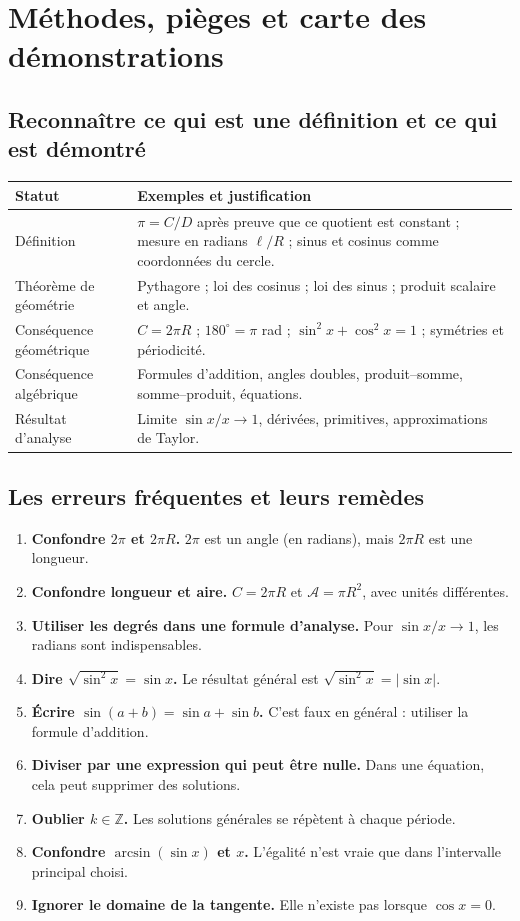 \documentclass[../cours_spe_trigo.tex]{subfiles}
\begin{document}
\setcounter{chapter}{17}
\chapter{Méthodes, pièges et carte des démonstrations}
\section{Reconnaître ce qui est une définition et ce qui est démontré}
\begin{center}
\begin{tabularx}{\linewidth}{@{}p{.28\linewidth} X@{}}
\toprule
\textbf{Statut} & \textbf{Exemples et justification}\\
\midrule
Définition & $\pi=C/D$ après preuve que ce quotient est constant ; mesure en radians $\ell/R$ ; sinus et cosinus comme coordonnées du cercle.\\
Théorème de géométrie & Pythagore ; loi des cosinus ; loi des sinus ; produit scalaire et angle.\\
Conséquence géométrique & $C=2\pi R$ ; $180^\circ=\pi$ rad ; $\sin^2x+\cos^2x=1$ ; symétries et périodicité.\\
Conséquence algébrique & Formules d'addition, angles doubles, produit--somme, somme--produit, équations.\\
Résultat d'analyse & Limite $\sin x/x\to1$, dérivées, primitives, approximations de Taylor.\\
\bottomrule
\end{tabularx}
\end{center}
\section{Les erreurs fréquentes et leurs remèdes}
\begin{enumerate}[label=\arabic*.]
\item \textbf{Confondre $2\pi$ et $2\pi R$.} $2\pi$ est un angle (en radians), mais $2\pi R$ est une longueur.
\item \textbf{Confondre longueur et aire.} $C=2\pi R$ et $\mathcal A=\pi R^2$, avec unités différentes.
\item \textbf{Utiliser les degrés dans une formule d'analyse.} Pour $\sin x/x\to1$, les radians sont indispensables.
\item \textbf{Dire $\sqrt{\sin^2x}=\sin x$.} Le résultat général est $\sqrt{\sin^2x}=|\sin x|$.
\item \textbf{Écrire $\sin(a+b)=\sin a+\sin b$.} C'est faux en général : utiliser la formule d'addition.
\item \textbf{Diviser par une expression qui peut être nulle.} Dans une équation, cela peut supprimer des solutions.
\item \textbf{Oublier $k\in\mathbb Z$.} Les solutions générales se répètent à chaque période.
\item \textbf{Confondre $\arcsin(\sin x)$ et $x$.} L'égalité n'est vraie que dans l'intervalle principal choisi.
\item \textbf{Ignorer le domaine de la tangente.} Elle n'existe pas lorsque $\cos x=0$.
\end{enumerate}
\end{document}
